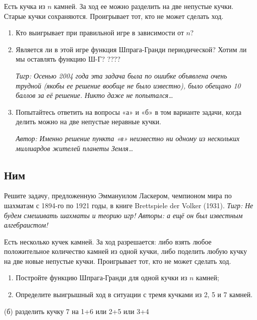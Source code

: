 \begin{problem}
Есть кучка из  $n$  камней. За ход ее можно разделить на две непустые кучки. Старые кучки сохраняются. Проигрывает тот, кто не может сделать ход. \par
\begin{enumerate}
\item 	Кто выигрывает при правильной игре в зависимости от $n$?\par
\item 	Является ли в этой игре функция Шпрага-Гранди периодической? {\red Хотим ли мы оставлять функцию Ш-Г?} ????\par
{\it Тигр: Осенью 2004 года эта задача была по ошибке объявлена очень трудной (якобы ее решение вообще не было известно), было обещано 10 баллов за её решение. Никто даже не попытался\ldots }\par
\item 	Попытайтесь ответить на вопросы «а» и «б» в том варианте задачи, когда делить можно на две непустые неравные кучки.\par
{\it Автор: Именно решение пункта «в» неизвестно ни одному из нескольких миллиардов жителей планеты Земля\ldots }\par
\end{enumerate}


\begin{sol}

\end{sol}
\end{problem}


\subsection{Ним}





\begin{problem}
Решите задачу, предложенную Эммануилом Ласкером, чемпионом мира по шахматам с 1894-го по 1921 годы, в книге Brettspiele der Volker (1931). {\it Тигр: Не будем смешивать шахматы и теорию игр! Авторы: а ещё он был известным алгебраистом!}\par
Есть несколько кучек камней. За ход разрешается: либо взять любое положительное количество камней из одной кучки, либо поделить любую кучку на две новые непустые кучки. Проигрывает тот, кто не может сделать ход.\par
\begin{enumerate}
\item 	Постройте функцию Шпрага-Гранди для одной кучки из  $n$  камней;\par
\item 	Определите выигрышный ход в ситуации с тремя кучками из 2, 5 и 7 камней.\par
\end{enumerate}


\begin{sol}
(б) разделить кучку 7 на 1+6 или 2+5 или 3+4
\end{sol}
\end{problem}

